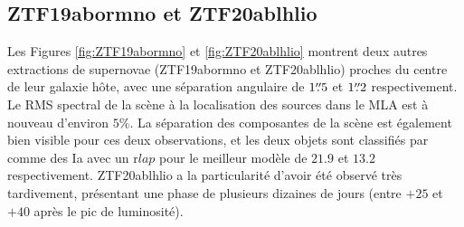 \documentclass[../main/main.tex]{subfiles}
\begin{document}

\subsection{ZTF19abormno et ZTF20ablhlio}

Les Figures \ref{fig:ZTF19abormno} et \ref{fig:ZTF20ablhlio} montrent
deux autres extractions de supernovae (ZTF19abormno et ZTF20ablhlio) proches du centre de leur galaxie
hôte, avec une séparation angulaire de $1\overset{\prime\prime}{.}5$ et $1\overset{\prime\prime}{.}2$ respectivement. Le RMS spectral de la
scène à la localisation des sources dans le MLA est à nouveau d'environ $5\%$. La séparation des
composantes de la scène est également bien visible pour ces deux
observations, et les deux objets sont classifiés par  comme
des Ia avec un r$lap$ pour le meilleur modèle de $21.9$ et $13.2$
respectivement. ZTF20ablhlio a la particularité d'avoir été observé très
tardivement, présentant une phase de plusieurs dizaines de jours (entre
$+25$ et $+40$ après le pic de luminosité).
\end{document}
